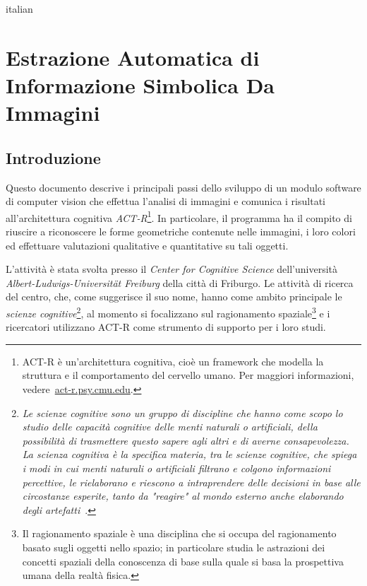 \begin{otherlanguage*}{italian}
\chapter*{Estrazione Automatica di Informazione Simbolica Da Immagini}
	
	\section*{Introduzione}
	Questo documento descrive i principali passi dello sviluppo di un modulo software di computer vision che effettua l'analisi di immagini e comunica i risultati all'architettura cognitiva \mbox{\emph{ACT-R}}\footnote{ACT-R è un'architettura cognitiva, cioè un framework che modella la struttura e il comportamento del cervello umano. Per maggiori informazioni, vedere~\url{act-r.psy.cmu.edu}.}.
	In particolare, il programma ha il compito di riuscire a riconoscere le forme geometriche contenute nelle immagini, i loro colori ed effettuare valutazioni qualitative e quantitative su tali oggetti.

	L'attività è stata svolta presso il \emph{Center for Cognitive Science} dell'università \emph{Albert-Ludwigs-Universität Freiburg} della città di Friburgo.
	Le attività di ricerca del centro, che, come suggerisce il suo nome, hanno come ambito principale le \emph{scienze cognitive}\footnote{\emph{Le scienze cognitive sono un gruppo di discipline che hanno come scopo lo studio delle capacità cognitive delle menti naturali o artificiali, della possibilità di trasmettere questo sapere agli altri e di averne consapevolezza. La scienza cognitiva è la specifica materia, tra le scienze cognitive, che spiega i modi in cui menti naturali o artificiali filtrano e colgono informazioni percettive, le rielaborano e riescono a intraprendere delle decisioni in base alle circostanze esperite, tanto da "reagire" al mondo esterno anche elaborando degli artefatti}~\cite{legrenzi2005prima}.}, 	
	al momento si focalizzano sul ragionamento spaziale\footnote{Il ragionamento spaziale è una disciplina che si occupa del ragionamento basato sugli oggetti nello spazio; in particolare studia le astrazioni dei concetti spaziali della conoscenza di base sulla quale si basa la prospettiva umana della realtà fisica.} e i ricercatori utilizzano ACT-R come strumento di supporto per i loro studi. 
	

\end{otherlanguage*}
